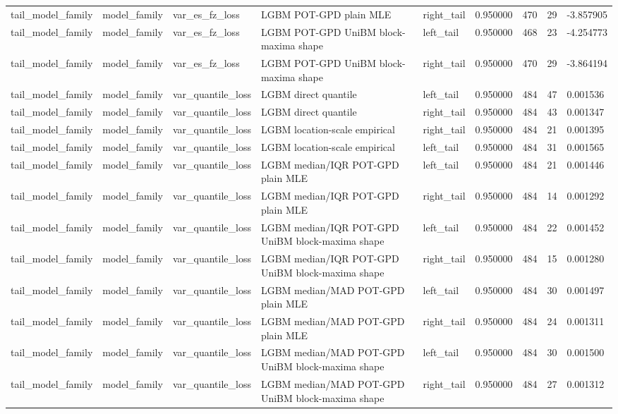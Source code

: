 \begin{tabular}{lllllrrr}
tail\_model\_family & model\_family & var\_es\_fz\_loss & LGBM POT-GPD plain MLE & right\_tail & 0.950000 & 470 & 29 & -3.857905 \\
tail\_model\_family & model\_family & var\_es\_fz\_loss & LGBM POT-GPD UniBM block-maxima shape & left\_tail & 0.950000 & 468 & 23 & -4.254773 \\
tail\_model\_family & model\_family & var\_es\_fz\_loss & LGBM POT-GPD UniBM block-maxima shape & right\_tail & 0.950000 & 470 & 29 & -3.864194 \\
tail\_model\_family & model\_family & var\_quantile\_loss & LGBM direct quantile & left\_tail & 0.950000 & 484 & 47 & 0.001536 \\
tail\_model\_family & model\_family & var\_quantile\_loss & LGBM direct quantile & right\_tail & 0.950000 & 484 & 43 & 0.001347 \\
tail\_model\_family & model\_family & var\_quantile\_loss & LGBM location-scale empirical & right\_tail & 0.950000 & 484 & 21 & 0.001395 \\
tail\_model\_family & model\_family & var\_quantile\_loss & LGBM location-scale empirical & left\_tail & 0.950000 & 484 & 31 & 0.001565 \\
tail\_model\_family & model\_family & var\_quantile\_loss & LGBM median/IQR POT-GPD plain MLE & left\_tail & 0.950000 & 484 & 21 & 0.001446 \\
tail\_model\_family & model\_family & var\_quantile\_loss & LGBM median/IQR POT-GPD plain MLE & right\_tail & 0.950000 & 484 & 14 & 0.001292 \\
tail\_model\_family & model\_family & var\_quantile\_loss & LGBM median/IQR POT-GPD UniBM block-maxima shape & left\_tail & 0.950000 & 484 & 22 & 0.001452 \\
tail\_model\_family & model\_family & var\_quantile\_loss & LGBM median/IQR POT-GPD UniBM block-maxima shape & right\_tail & 0.950000 & 484 & 15 & 0.001280 \\
tail\_model\_family & model\_family & var\_quantile\_loss & LGBM median/MAD POT-GPD plain MLE & left\_tail & 0.950000 & 484 & 30 & 0.001497 \\
tail\_model\_family & model\_family & var\_quantile\_loss & LGBM median/MAD POT-GPD plain MLE & right\_tail & 0.950000 & 484 & 24 & 0.001311 \\
tail\_model\_family & model\_family & var\_quantile\_loss & LGBM median/MAD POT-GPD UniBM block-maxima shape & left\_tail & 0.950000 & 484 & 30 & 0.001500 \\
tail\_model\_family & model\_family & var\_quantile\_loss & LGBM median/MAD POT-GPD UniBM block-maxima shape & right\_tail & 0.950000 & 484 & 27 & 0.001312 \\

\end{tabular}
